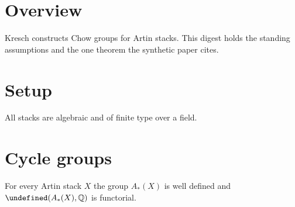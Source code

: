 
\let\Hom\undefined
\newcommand{\Hom}{\mathrm{Hom}}

\section*{Overview}
Kresch constructs Chow groups for Artin stacks. This digest holds the standing assumptions and the one theorem the synthetic paper cites.

\section{Setup}\label{Kre99-sec-1}

\begin{theorem}\label{Kre99-setup}
All stacks are algebraic and of finite type over a field.
\end{theorem}

\section{Cycle groups}\label{Kre99-sec-2}

\begin{theorem}\label{Kre99-thm-2.1}
For every Artin stack $X$ the group $A_*(X)$ is well defined and $\Hom(A_*(X), \mathbb{Q})$ is functorial.
\end{theorem}
